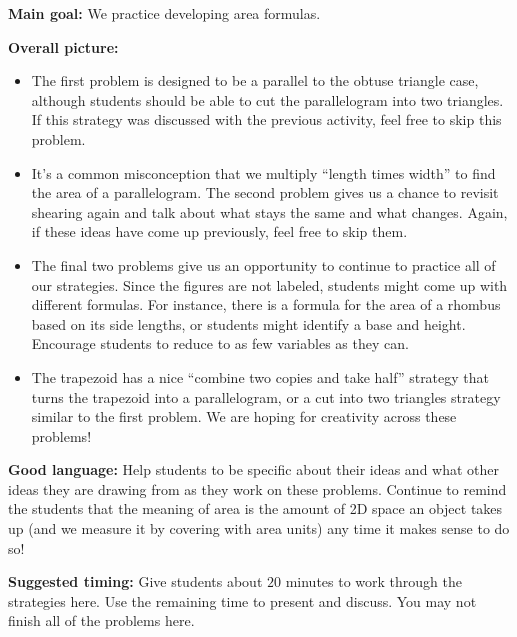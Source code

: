 \documentclass[nooutcomes,noauthor]{ximera}
\begin{document}
\newpage

\begin{instructorNotes} 

{\bf Main goal:} We practice developing area formulas.

{\bf Overall picture:} 
\begin{itemize}
	\item The first problem is designed to be a parallel to the obtuse triangle case, although students should be able to cut the parallelogram into two triangles. If this strategy was discussed with the previous activity, feel free to skip this problem.
	\item It's a common misconception that we multiply ``length times width'' to find the area of a parallelogram. The second problem gives us a chance to revisit shearing again and talk about what stays the same and what changes. Again, if these ideas have come up previously, feel free to skip them.
	\item The final two problems give us an opportunity to continue to practice all of our strategies. Since the figures are not labeled, students might come up with different formulas. For instance, there is a formula for the area of a rhombus based on its side lengths, or students might identify a base and height. Encourage students to reduce to as few variables as they can.
	\item The trapezoid has a nice ``combine two copies and take half'' strategy that turns the trapezoid into a parallelogram, or a cut into two triangles strategy similar to the first problem. We are hoping for creativity across these problems!
\end{itemize}


{\bf Good language:} Help students to be specific about their ideas and what other ideas they are drawing from as they work on these problems. Continue to remind the students that the meaning of area is the amount of 2D space an object takes up (and we measure it by covering with area units) any time it makes sense to do so!



{\bf Suggested timing:} Give students about $20$ minutes to work through the strategies here. Use the remaining time to present and discuss. You may not finish all of the problems here.



\end{instructorNotes}
\end{document}

